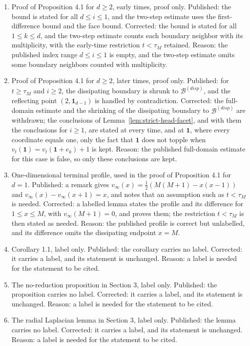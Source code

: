 \documentclass[12pt]{amsart}
\begin{document}
\begin{enumerate}
\item[C19.] Proof of Proposition 4.1 for $d \geq 2$, early times, proof only. Published: the bound is stated for all $d \leq i \leq 1$, and the two-step estimate uses the first-difference bound and the face bound. Corrected: the bound is stated for all $1 \leq k \leq d$, and the two-step estimate counts each boundary neighbor with its multiplicity, with the early-time restriction $t < \tau_M$ retained. Reason: the published index range $d \leq i \leq 1$ is empty, and the two-step estimate omits some boundary neighbors counted with multiplicity.
\item[C20.] Proof of Proposition 4.1 for $d \geq 2$, later times, proof only. Published: for $t \geq \tau_M$ and $i \geq 2$, the dissipating boundary is shrunk to $\mathcal B^{(disp)}$, and the reflecting point $(2, \mathbf{1}_{d-1})$ is handled by contradiction. Corrected: the full-domain estimate and the shrinking of the dissipating boundary to $\mathcal B^{(disp)}$ are withdrawn; the conclusions of Lemma~\ref{lem:strict-head-facet}, and with them the conclusions for $i\geq1$, are stated at every time, and at $\mathbf 1$, where every coordinate equals one, only the fact that $\mathbf 1$ does not topple when $v_t(\mathbf 1)=v_t(\mathbf 1+e_k)+1$ is kept. Reason: the published full-domain estimate for this case is false, so only these conclusions are kept.
\item[C21.] One-dimensional terminal profile, used in the proof of Proposition 4.1 for $d=1$. Published: a remark gives $v_\infty(x) = \frac12 \left( M(M+1) - x(x-1) \right)$ and $v_\infty(x) - v_\infty(x+1) = x$, and notes that an assumption such as $t < \tau_M$ is needed. Corrected: a labelled lemma states the profile and its difference for $1 \leq x \leq M$, with $v_\infty(M+1) = 0$, and proves them; the restriction $t < \tau_M$ is then stated as needed. Reason: the published profile is correct but unlabelled, and its difference omits the dissipating endpoint $x = M$.
\item[C22.] Corollary 1.1, label only. Published: the corollary carries no label. Corrected: it carries a label, and its statement is unchanged. Reason: a label is needed for the statement to be cited.
\item[C23.] The no-reduction proposition in Section 3, label only. Published: the proposition carries no label. Corrected: it carries a label, and its statement is unchanged. Reason: a label is needed for the statement to be cited.
\item[C24.] The radial Laplacian lemma in Section 3, label only. Published: the lemma carries no label. Corrected: it carries a label, and its statement is unchanged. Reason: a label is needed for the statement to be cited.

\end{enumerate}
\end{document}
